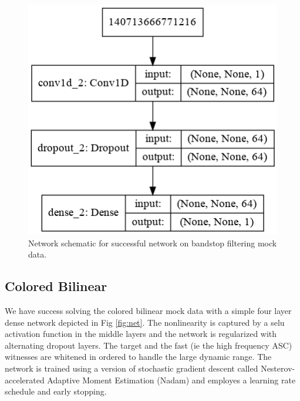 \begin{refsection}
\begin{figure}[htbp]
   \centering
   \includegraphics[width=0.7\columnwidth]{chapter_noise_sub/etc/bandstop_net}
  \caption{Network schematic for successful network on bandstop filtering mock data.}
   \label{fig:bandstop_net}
\end{figure}

\subsection{Colored Bilinear}
We have success solving the colored bilinear mock data with a simple four layer dense network depicted in Fig \ref{fig:net}.
The nonlinearity is captured by a selu activation function in the middle layers and the network is regularized with alternating dropout layers. 
The target and the  fast (ie the high frequency ASC) witnesses are whitened in ordered to handle the large dynamic range.
The network is trained using a version of stochastic gradient descent called Nesterov-accelerated Adaptive Moment Estimation (Nadam) and employes a learning rate schedule and early stopping.



\end{refsection}
